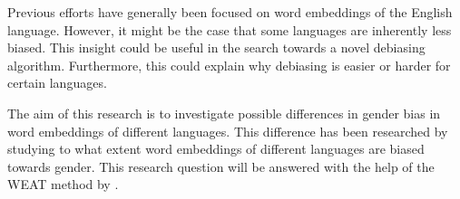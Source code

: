 Previous efforts have generally been focused on word embeddings of the English language.
However, it might be the
case that some languages are inherently less biased.
This insight could be useful in the search towards a novel
debiasing algorithm. 
Furthermore, this could explain why debiasing is easier or harder for certain languages.

The aim of this research is to investigate possible differences in gender bias in word
embeddings of different languages. This difference has been researched by studying to
what extent word
embeddings of different languages are biased towards gender.
This research question will be answered with the help of the WEAT method by
\textcite{caliskan_2017_semantics_language_corpora}.
